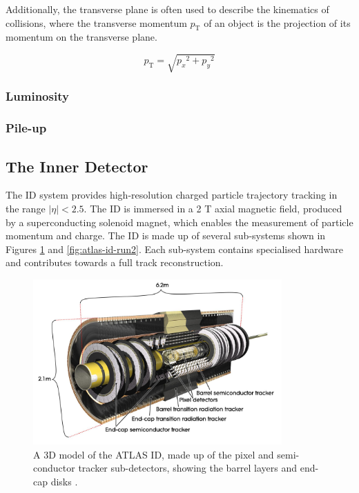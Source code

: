 Additionally, the transverse plane is often used to describe the kinematics of collisions, where the transverse momentum $p_{\text{T}}$ of an object is the projection of its momentum on the transverse plane.

%
\begin{equation}\label{eq:pt}
  p_\text{T} = \sqrt{ {p_x}^2 + {p_y}^2 }
\end{equation}


\subsubsection{Luminosity}

\subsubsection{Pile-up}



\subsection{The Inner Detector}
\label{inner-detector}

The ID system provides high-resolution charged particle trajectory tracking in the range $ \lvert \eta \rvert < 2.5$. The ID is immersed in a 2 T axial magnetic field, produced by a superconducting solenoid magnet, which enables the measurement of particle momentum and charge. The ID is made up of several sub-systems shown in Figures \ref{fig:atlas-id-run1} and \ref{fig:atlas-id-run2}. Each sub-system contains specialised hardware and contributes towards a full track reconstruction. 

\begin{figure}[!htbp]
  \centering
  \includegraphics[width=0.85\textwidth]{images/2-LHC-ATLAS/atlas_id.jpg}
  \caption{
    A 3D model of the ATLAS ID, made up of the pixel and semi-conductor tracker sub-detectors, showing the barrel layers and end-cap disks \cite{atlasid}.
  }
  \label{fig:atlas-id-run1}
\end{figure}

